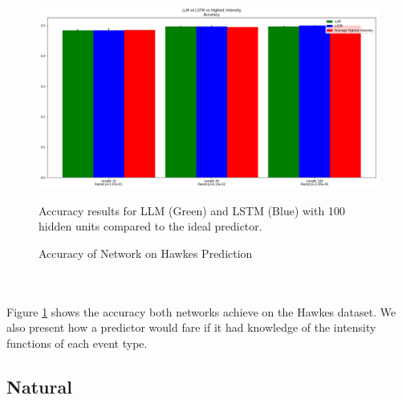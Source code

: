 \begin{figure}
    \centering
    \includegraphics[width=1.0\textwidth]{figures/Hawkes1.png}
    \caption{Accuracy of Network on Hawkes Prediction}
    \label{fig:hawkes1}
    Accuracy results for LLM (Green) and LSTM (Blue) with 100 hidden units compared to the ideal predictor.
\end{figure}
\\\\Figure \ref{fig:hawkes1} shows the accuracy both networks achieve on the Hawkes dataset. We also present how a predictor would fare if it had knowledge of the intensity functions of each event type. 
\subsection{Natural}

